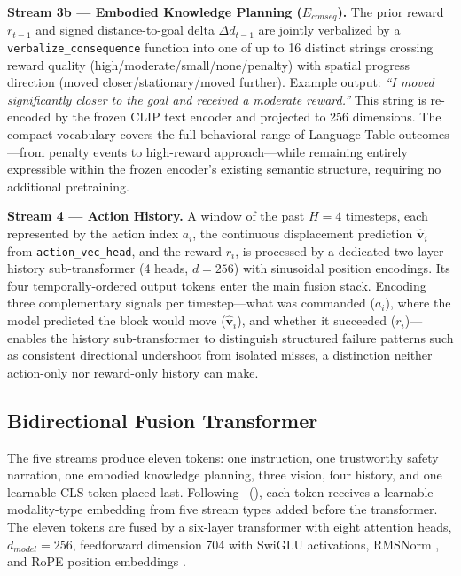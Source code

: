 \documentclass[letterpaper]{article} %
\begin{document}
\textbf{Stream 3b --- Embodied Knowledge Planning ($E_{conseq}$).} The prior reward $r_{t-1}$ and signed distance-to-goal delta $\Delta d_{t-1}$ are jointly verbalized by a \texttt{verbalize\_consequence} function into one of up to 16 distinct strings crossing reward quality (high/moderate/small/none/penalty) with spatial progress direction (moved closer/stationary/moved further). Example output: \textit{``I moved significantly closer to the goal and received a moderate reward.''}  This string is re-encoded by the frozen CLIP text encoder and projected to 256 dimensions. The compact vocabulary covers the full behavioral range of Language-Table outcomes---from penalty events to high-reward approach---while remaining entirely expressible within the frozen encoder's existing semantic structure, requiring no additional pretraining.

\textbf{Stream 4 --- Action History.} A window of the past $H{=}4$ timesteps, each represented by the action index $a_i$, the continuous displacement prediction $\hat{\mathbf{v}}_i$ from \texttt{action\_vec\_head}, and the reward $r_i$, is processed by a dedicated two-layer history sub-transformer (4 heads, $d{=}256$) with sinusoidal position encodings. Its four temporally-ordered output tokens enter the main fusion stack. Encoding three complementary signals per timestep---what was commanded ($a_i$), where the model predicted the block would move ($\hat{\mathbf{v}}_i$), and whether it succeeded ($r_i$)---enables the history sub-transformer to distinguish structured failure patterns such as consistent directional undershoot from isolated misses, a distinction neither action-only nor reward-only history can make.

\subsection{Bidirectional Fusion Transformer}

The five streams produce eleven tokens: one instruction, one trustworthy safety narration, one embodied knowledge planning, three vision, four history, and one learnable CLS token placed last. Following \citeauthor{kim2021vilt}~(\citeyear{kim2021vilt}), each token receives a learnable modality-type embedding from five stream types added before the transformer. The eleven tokens are fused by a six-layer transformer with eight attention heads, $d_{model}{=}256$, feedforward dimension 704 with SwiGLU \cite{shazeer2020swiglu} activations, RMSNorm \cite{zhang2019rmsnorm}, and RoPE position embeddings \cite{su2021rope}.
\end{document}
